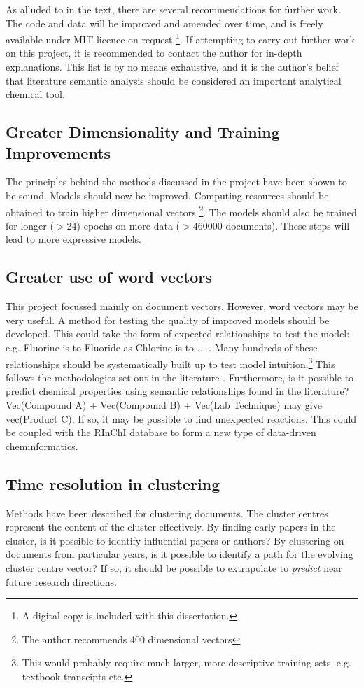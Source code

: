 \label{chapt:RECOMMENDATIONS}
As alluded to in the text, there are several recommendations for further work. The code and data will be improved and amended over time, and is freely available under MIT licence on request \footnote{A digital copy is included with this dissertation.}. If attempting to carry out further work on this project, it is recommended to contact the author for in-depth explanations. This list is by no means exhaustive, and it is the author's belief that literature semantic analysis should be considered an important analytical chemical tool.
\subsection{Greater Dimensionality and Training Improvements}
The principles behind the methods discussed in the project have been shown to be sound. Models should now be improved. Computing resources should be obtained to train higher dimensional vectors \footnote{ The author recommends 400 dimensional vectors}. The models should also be trained for longer ($> 24$) epochs on more data ($> 460000$ documents). These steps will lead to more expressive models.
\subsection{Greater use of word vectors}
This project focussed mainly on document vectors. However, word vectors may be very useful. A method for testing the quality of improved models should be developed. This could take the form of expected relationships to test the model: e.g. Fluorine is to Fluoride as Chlorine is to ... . Many hundreds of these relationships should be systematically built up to test model intuition.\footnote{This would probably require much larger, more descriptive training sets, e.g. textbook transcipts etc.} This follows the methodologies set out in the literature \cite{word2vec1} \cite{word2vec2}. Furthermore, is it possible to predict chemical properties using semantic relationships found in the literature? Vec(Compound A) + Vec(Compound B) + Vec(Lab Technique) may give vec(Product C). If so, it may be possible to find unexpected reactions. This could be coupled with the RInChI database to form a new type of data-driven cheminformatics.
\subsection{Time resolution in clustering}
Methods have been described for clustering documents. The cluster centres represent the content of the cluster effectively. By finding early papers in the cluster, is it possible to identify influential papers or authors?
By clustering on documents from particular years, is it possible to identify a path for the evolving cluster centre vector? If so, it should be possible to extrapolate to \emph{predict} near future research directions.
